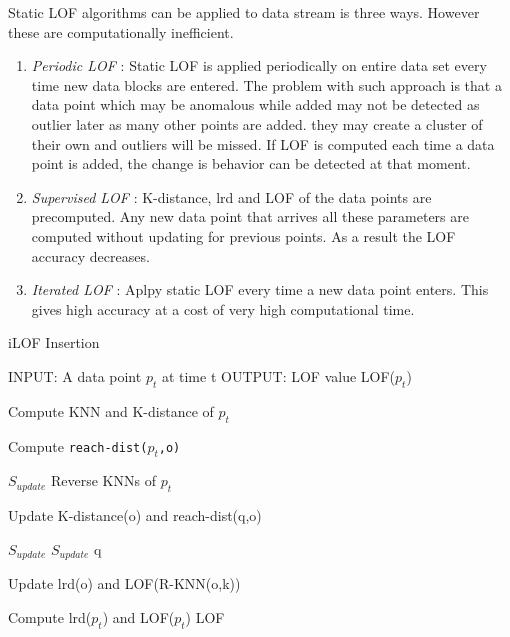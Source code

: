 	Static LOF algorithms can be applied to data stream is three ways. However these are computationally inefficient.
	
	\begin{enumerate}
		\item \textit{Periodic LOF} : Static LOF is applied periodically on entire data set every time new data blocks are entered. The problem with such approach is that a data point which may be anomalous while added may not be detected as outlier later as many other points are added. they may create a cluster of their own and outliers will be missed. If LOF is computed each time a data point is added, the change is behavior can be detected at that moment.
		
		\item \textit{Supervised LOF} : K-distance, lrd and LOF of the data points are precomputed. Any new data point that arrives all these parameters are computed without updating for previous points. As a result the LOF accuracy decreases. 
		
		\item \textit{Iterated LOF} : Aplpy static LOF every time a new data point enters. This gives high accuracy at a cost of very high computational time. 
		
		
	\end{enumerate} 
	

	\begin{algorithm}[H]
		\caption{iLOF Insertion}
		\begin{algorithmic}
			\STATE  
			\STATE INPUT:  A data point $p_t$ at time t
			\STATE OUTPUT: LOF value LOF($p_t$)
			\STATE
			
			\STATE Compute KNN and K-distance of $p_t$
			
			
			\STATE Compute \texttt{reach-dist($p_t$,o)}
			
			\ENDFOR
			
			\STATE  $S_{update}$ \leftarrow Reverse KNNs of $p_t$
			
			
			\STATE Update K-distance(o) and reach-dist(q,o)
			
			
			\STATE $S_{update}$ \leftarrow  $S_{update}$ \cup q
			\ENDIF
			
			\ENDFOR
			
			
			\STATE Update lrd(o) and LOF(R-KNN(o,k))
			
			\ENDFOR
			\STATE Compute lrd($p_t$) and LOF($p_t$)
			\RETURN LOF
			
			
		\end{algorithmic}
	\end{algorithm}

